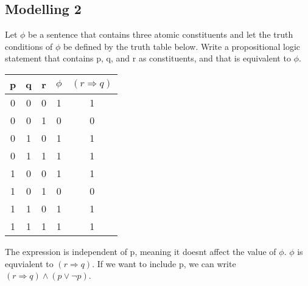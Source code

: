 \subsection{Modelling 2}
\begin{large}
  Let $\phi$ be a sentence that contains three atomic constituents and let the truth conditions of $\phi$ be defined
  by the truth table below. Write a propositional logic statement that contains p, q, and r as constituents,
  and that is equivalent to $\phi$.
  \begin{tabular}{c|c|c||c||c}
    p & q & r & $ \phi$ & $ (r \Rightarrow q) $ \\
    \hline\hline
    0 & 0 & 0 & 1       & 1                     \\
    \hline
    0 & 0 & 1 & 0       & 0                     \\
    \hline
    0 & 1 & 0 & 1       & 1                     \\
    \hline
    0 & 1 & 1 & 1       & 1                     \\
    \hline
    1 & 0 & 0 & 1       & 1                     \\
    \hline
    1 & 0 & 1 & 0       & 0                     \\
    \hline
    1 & 1 & 0 & 1       & 1                     \\
    \hline
    1 & 1 & 1 & 1       & 1                     \\
    \hline
  \end{tabular}

  The expression is independent of p, meaning it doesnt affect the value of $\phi$. $\phi$ is equvialent to $(r \Rightarrow q)$. If we want to include p, we can write $ (r \Rightarrow q)  \land (p \lor \neg p) $.
\end{large}